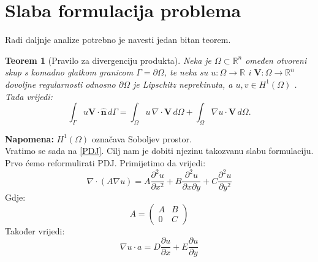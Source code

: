 \documentclass[zavrsnirad]{../fer}
\newtheorem{teorem}{Teorem}
\begin{document}
\section{Slaba formulacija problema}
\label{slabaFormulacija}
Radi daljnje analize potrebno je navesti jedan bitan 
teorem.
\\ 
\begin{teorem}[Pravilo za divergenciju produkta]
\label{tm1}
Neka je $\Omega \subset \mathbb{R}^n$ omeđen otvoreni
skup s komadno glatkom granicom $\Gamma = \partial \Omega$,
te neka su $u : \Omega \to \mathbb{R}$ i $\mathbf{V} : \Omega \to \mathbb{R}^n$ 
dovoljne regularnosti odnosno $\partial \Omega$ je
Lipschitz neprekinuta, a $u,v \in H^1(\Omega)$
. Tada vrijedi:
\[
\int_{\Gamma} u \mathbf{V} \cdot \hat{\mathbf{n}} \, d\Gamma = 
\int_{\Omega} u \, \nabla \cdot \mathbf{V} \, d\Omega + 
\int_{\Omega} \nabla u \cdot \mathbf{V} \, d\Omega.
\]
\end{teorem}
\textbf{Napomena:} $H^1(\Omega)$ označava Soboljev prostor.
\bigskip
\\ 
Vratimo se sada na \ref{PDJ}.
Cilj nam je dobiti njezinu takozvanu slabu formulaciju.
Prvo ćemo reformulirati PDJ. Primijetimo da vrijedi:
$$\nabla \cdot (A \nabla u) = 
  A \frac{\partial^2 u}{\partial x^2}
	+ B \frac{\partial^2 u}{\partial x \partial y}
	+ C \frac{\partial^2 u}{\partial y^2}
$$
Gdje:
$$A = 
\begin{pmatrix}
  A & B \\ 
  0 & C
\end{pmatrix}
 $$
 Također vrijedi:
 $$ \nabla u \cdot a =
 D \frac{\partial u}{\partial x}
	+ E \frac{\partial u}{\partial y} $$
\end{document}
